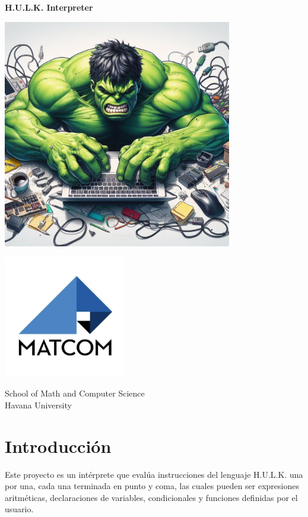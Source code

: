 \documentclass[12pt,a4paper]{article}
\begin{document}
\begin{titlepage}
	\begin{center}
		\Huge
		\textbf{H.U.L.K. Interpreter}
		\vspace*{1cm}
		
		\includegraphics[width=0.75\textwidth]{HULK.jpg}
		\vspace{1cm}
		
		\LARGE
		
		
		\includegraphics[width=0.4\textwidth]{logo matcom.jpg}
		
		\Large
		School of Math and Computer Science\\
		Havana University
		
	\end{center}
\end{titlepage}

\newpage
\tableofcontents
\newpage


\section{Introducción}\label{sec:intro}
Este proyecto es un intérprete que evalúa instrucciones del lenguaje H.U.L.K. una por una, cada una terminada en punto y coma, las cuales pueden ser expresiones aritméticas, declaraciones de variables, condicionales y funciones definidas por el usuario.
\end{document}
